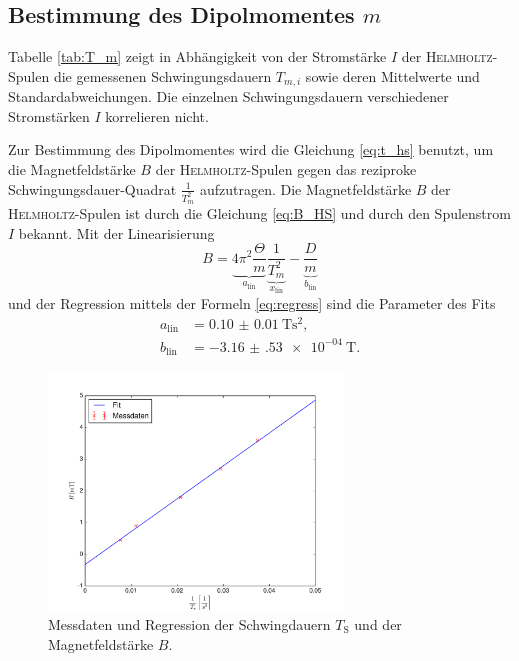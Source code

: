 \subsection{Bestimmung des Dipolmomentes \texorpdfstring{$m$}{m}}
\label{sec:auswertung2}
Tabelle \ref{tab:T_m} zeigt in Abhängigkeit von der Stromstärke $I$ der \textsc{Helmholtz}-Spulen die gemessenen Schwingungsdauern $T_{m,i}$ sowie deren Mittelwerte und Standardabweichungen. 
Die einzelnen Schwingungsdauern verschiedener Stromstärken $I$ korrelieren nicht.

Zur Bestimmung des Dipolmomentes wird die Gleichung \eqref{eq:t_hs} benutzt, um die Magnetfeldstärke $B$ 
der \textsc{Helmholtz}-Spulen gegen das reziproke Schwingungsdauer-Quadrat $\frac{1}{T_{m}^2}$ aufzutragen.
Die Magnetfeldstärke $B$ der \textsc{Helmholtz}-Spulen ist durch die Gleichung \eqref{eq:B_HS} und durch den Spulenstrom $I$ bekannt.
Mit der Linearisierung
\begin{equation}
	B = \underbrace{4\pi^2\frac{\Theta}{m}}_{a_\text{lin}} \underbrace{\frac{1}{T_m^2}}_{x_\text{lin}} - \underbrace{\frac{D}{m}}_{b_\text{lin}}
	\label{eq:B_lin}
\end{equation}
und der Regression mittels der Formeln \eqref{eq:regress}
sind die Parameter des Fits
\begin{align}
	a_\text{lin}&=	\SI{0.10(1)}{\tesla\second\squared}, \\%
	b_\text{lin}&=	-\SI{3.16(53)e-04}{\tesla}.
\end{align}
\begin{figure}[p]
	\centering
	\includegraphics[width=0.7\textwidth]{Bilder/Magnetfeld.pdf}
	\caption{Messdaten und Regression der Schwingdauern $T_\text{S}$ und der Magnetfeldstärke $B$.}
	\label{fig:Magnetfeld}
\end{figure}
